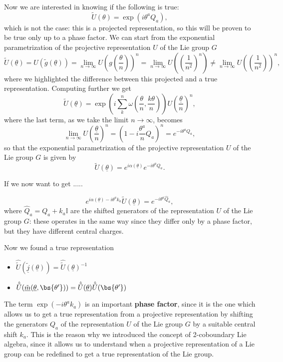 Now we are interested in knowing if the following is true:
\[
    \tilde{U}(\theta) = \exp(i\theta^a Q_a),
\]
which is not the case: this is a projected representation, so this will be proven to be true only up to a phase factor. We can start from the exponential parametrization of the projective representation \(U\) of the Lie group \(G\)
\[
    \tilde{U}(\underline{\theta}) = U(\tilde{g}(\underline{\theta})) = \lim_{n \to \infty} U(g(\frac{\theta}{n}))^n = \lim_{n \to \infty} U((\frac{1}{n^2})^n) \neq \lim_{n \to \infty} U((\frac{1}{n^2}))^n,
\]
where we highlighted the difference between this projected and a true representation. Computing further we get
\[
    \tilde{U}(\underline{\theta}) = \exp(i \sum_{k}^{n} \omega(\frac{\theta}{n}, \frac{k\theta}{n})) U(\frac{\underline{\theta}}{n})^n,
\]
where the last term, as we take the limit \(n \to \infty\), becomes
\[
    \lim_{n \to \infty} U(\frac{\underline{\theta}}{n})^n = (1 - i \frac{\theta^a}{n} Q_a)^n = e^{-i \theta^a Q_a},
\]
so that the exponential parametrization of the projective representation \(U\) of the Lie group \(G\) is given by
\[
    \tilde{U}(\underline{\theta}) = e^{i \alpha(\underline{\theta})} e^{-i \theta^a Q_a}.
\]

If we now want to get .....

\[
    e^{i \alpha(\underline{\theta}) - i \theta^a k_a} \tilde{U}(\underline{\theta}) = e^{-i \theta^a \hat{Q}_a},
\]
where \(\hat{Q}_a = Q_a + k_a \mathbb{I}\) are the shifted generators of the representation \(U\) of the Lie group \(G\): these operates in the same way since they differ only by a phase factor, but they have different central charges.

Now we found a true representation
\begin{itemize}
    \item \(\hat{\tilde{U}}(\tilde{\underline{j}}(\underline{\theta})) = \hat{\tilde{U}}(\underline{\theta})^{-1}\)
    \item \(\hat{\tilde{U}}(\tilde{\underline{m}}(\underline{\theta}, \bs{\theta'})) = \hat{\tilde{U}}(\underline{\theta}) \hat{\tilde{U}}(\bs{\theta'})\)
\end{itemize}

The term \(\exp(-i \theta^a k_a)\) is an important \textbf{phase factor}, since it is the one which allows us to get a true representation from a projective representation by shifting the generators \(Q_a\) of the representation \(U\) of the Lie group \(G\) by a suitable central shift \(k_a\). This is the reason why we introduced the concept of 2-coboundary Lie algebra, since it allows us to understand when a projective representation of a Lie group can be redefined to get a true representation of the Lie group.

